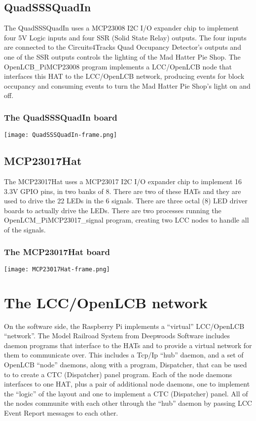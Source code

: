 \subsection{QuadSSSQuadIn}

The QuadSSSQuadIn uses a MCP23008 I2C I/O expander chip to implement four 5V 
Logic inputs and four SSR (Solid State Relay) outputs.  The four inputs are 
connected to the Circuits4Tracks Quad Occupancy Detector's outputs and one of 
the SSR outputs controls the lighting of the Mad Hatter Pie Shop.  The 
OpenLCB\_PiMCP23008 program implements a LCC/OpenLCB node that interfaces this 
HAT to the LCC/OpenLCB network, producing events for block occupancy and 
consuming events to turn the Mad Hatter Pie Shop's light on and off.

\begin{frame}
    \frametitle{The QuadSSSQuadIn board}
    \texttt{[image: QuadSSSQuadIn-frame.png]}
\end{frame}


\subsection{MCP23017Hat}

The MCP23017Hat uses a MCP23017 I2C I/O expander chip to implement 16 3.3V 
GPIO pins, in two banks of 8.  There are two of these HATs and they are used 
to drive the 22 LEDs in the 6 signals.  There are three octal (8) LED driver 
boards to actually drive the LEDs.  There are two processes running the 
OpenLCM\_PiMCP23017\_signal program, creating two LCC nodes to handle all of 
the signals.

\begin{frame}
   \frametitle{The MCP23017Hat board}
   \texttt{[image: MCP23017Hat-frame.png]}
\end{frame}

\section{The LCC/OpenLCB network}

On the software side, the Raspberry Pi implements a ``virtual'' LCC/OpenLCB
``network''. The Model Railroad System from Deepwoods Software includes daemon
programs that interface to the HATs and to provide a virtual network for them
to communicate over. This includes a Tcp/Ip ``hub'' daemon, and a set of
OpenLCB ``node'' daemons, along with a program, Dispatcher, that can be used
to to create a CTC (Dispatcher) panel program. Each of the node daemons
interfaces to one HAT, plus a pair of additional node daemons, one to
implement the ``logic'' of the layout and one to implement a CTC (Dispatcher)
panel. All of the nodes communite with each other through the ``hub'' daemon
by passing LCC Event Report messages to each other. 

